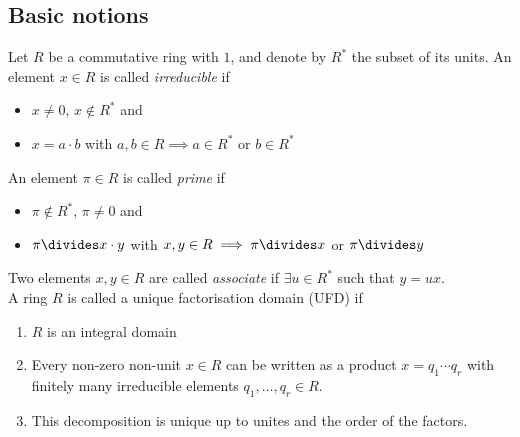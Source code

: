\documentclass[NumTh.tex]{subfiles}
\begin{document}
\subsection{Basic notions}

Let $R$ be a commutative ring with $1$,
and denote by $R^\ast$ the subset of its units.
An element $x \in R$ is called \emph{irreducible} if
\begin{itemize}
  \item $x \neq 0$, $x \nin R^\ast$ and
  \item $x = a \cdot b$ with $a,b \in R \implies a \in R^\ast$ or $b \in R^\ast$
\end{itemize}
An element $\pi \in R$ is called \emph{prime} if
\begin{itemize}
  \item $\pi \nin R^\ast$, $\pi \neq 0$ and
  \item $\pi \divides x \cdot y$ with $x,y \in R \implies \pi \divides x$ or $\pi \divides y$
\end{itemize}
Two elements $x,y \in R$ are called \emph{associate} if $\exists u \in R^\ast$ such that $y = ux$.
\\

A ring $R$ is called a unique factorisation domain (UFD) if
\begin{enumerate}
  \item $R$ is an integral domain
  \item Every non-zero non-unit $x \in R$ can be written as a product $x = q_1 \cdots q_r$ with finitely many irreducible elements $q_1,\dots,q_r \in R$.
  \item This decomposition is unique up to unites and the order of the factors.
\end{enumerate}
\end{document}
